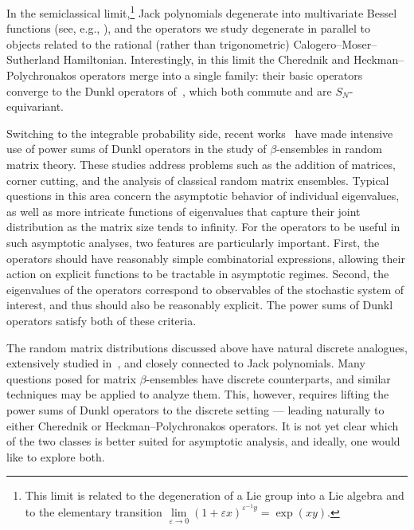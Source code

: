 \documentclass[11pt]{article}
\theoremstyle{definition}
\numberwithin{equation}{section}
\newcommand{\eps}{\varepsilon}
\begin{document}
In the semiclassical limit,\footnote{This limit is related to the degeneration of a Lie group into a Lie algebra and to the elementary transition $\lim\limits_{\eps \to 0}(1+\eps x)^{\eps^{-1}y} = \exp(xy)$.} Jack polynomials degenerate into multivariate Bessel functions (see, e.g., \cite[Section 4]{okounkov1997shifted}), and the operators we study degenerate in parallel to objects related to the rational (rather than trigonometric) Calogero--Moser--Sutherland Hamiltonian. Interestingly, in this limit the Cherednik and Heckman--Polychronakos operators merge into a single family: their basic operators converge to the Dunkl operators of~\cite{dunkl1989differential}, which both commute and are $S_N$-equivariant.


Switching to the integrable probability side, recent works~\cite{benaych2022matrix,xu2023rectangular,GXZ2024,KX2024} have made intensive use of power sums of Dunkl operators in the study of $\beta$-ensembles in random matrix theory. These studies address problems such as the addition of matrices, corner cutting, and the analysis of classical random matrix ensembles. Typical questions in this area concern the asymptotic behavior of individual eigenvalues, as well as more intricate functions of eigenvalues that capture their joint distribution as the matrix size tends to infinity. For the operators to be useful in such asymptotic analyses, two features are particularly important. First, the operators should have reasonably simple combinatorial expressions, allowing their action on explicit functions to be tractable in asymptotic regimes. Second, the eigenvalues of the operators correspond to observables of the stochastic system of interest, and thus should also be reasonably explicit. The power sums of Dunkl operators satisfy both of these criteria.

The random matrix distributions discussed above have natural discrete analogues, extensively studied in~\cite{kerov2000anisotropic, borodin2005z, gorin2015multilevel,dolega2016gaussian,borodin2017gaussian, dolega2019gaussian, guionnet2019rigidity,huang2021law,dimitrov2022asymptotics,cuenca2023universality,moll2023gaussian, dimitrov2024global,gorin2024dynamical}, and closely connected to Jack polynomials. Many questions posed for matrix $\beta$-ensembles have discrete counterparts, and similar techniques may be applied to analyze them. This, however, requires lifting the power sums of Dunkl operators to the discrete setting --- leading naturally to either Cherednik or Heckman--Polychronakos operators. It is not yet clear which of the two classes is better suited for asymptotic analysis, and ideally, one would like to explore both.
\end{document}

